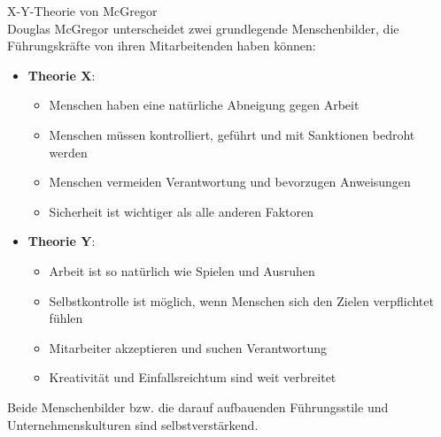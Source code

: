 \begin{concept}{X-Y-Theorie von McGregor}\\
Douglas McGregor unterscheidet zwei grundlegende Menschenbilder, die Führungskräfte von ihren Mitarbeitenden haben können:
\begin{itemize}
    \item \textbf{Theorie X}:
    \begin{itemize}
        \item Menschen haben eine natürliche Abneigung gegen Arbeit
        \item Menschen müssen kontrolliert, geführt und mit Sanktionen bedroht werden
        \item Menschen vermeiden Verantwortung und bevorzugen Anweisungen
        \item Sicherheit ist wichtiger als alle anderen Faktoren
    \end{itemize}
    \item \textbf{Theorie Y}:
    \begin{itemize}
        \item Arbeit ist so natürlich wie Spielen und Ausruhen
        \item Selbstkontrolle ist möglich, wenn Menschen sich den Zielen verpflichtet fühlen
        \item Mitarbeiter akzeptieren und suchen Verantwortung
        \item Kreativität und Einfallsreichtum sind weit verbreitet
    \end{itemize}
\end{itemize}

Beide Menschenbilder bzw. die darauf aufbauenden Führungsstile und Unternehmenskulturen sind selbstverstärkend.
\end{concept}

